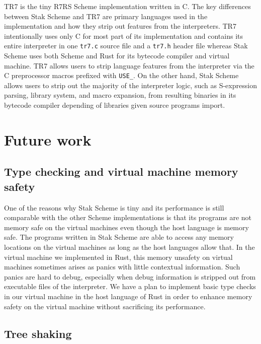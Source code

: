 \documentclass[sigplan, anonymous, review]{acmart}
\begin{document}
TR7 \cite{tr7} is the tiny R7RS Scheme implementation written in C.
The key differences between Stak Scheme and TR7 are primary languages used in
the implementation and how they strip out features from the
interpreters.
TR7 intentionally uses only C for most part of its implementation and
contains its entire interpreter in one \texttt{tr7.c} source file and a
\texttt{tr7.h} header file whereas Stak Scheme uses both Scheme and
Rust for its bytecode compiler and virtual machine.
TR7 allows users to strip language features from the interpreter via
the C preprocessor macros prefixed with \texttt{USE\_}.
On the other hand, Stak Scheme allows users to strip out the majority of
the interpreter logic, such as S-expression parsing, library system, and
macro expansion, from resulting binaries in its bytecode compiler
depending of libraries given source programs import.

\section{Future work}

\subsection{Type checking and virtual machine memory safety}

One of the reasons why Stak Scheme is tiny and its performance is still
comparable with the other Scheme implementations is that its
programs are not memory safe on the virtual machines even though
the host language is memory safe.
The programs written in Stak Scheme are able to access any memory
locations on the virtual machines as long as the host languages allow that.
In the virtual machine we implemented in Rust, this memory
unsafety on virtual machines sometimes arises as panics with little
contextual information.
Such panics are hard to debug, especially when debug information is
stripped out from executable files of the interpreter.
We have a plan to implement basic type checks in our virtual machine
in the host language of Rust in order to enhance memory safety on
the virtual machine without sacrificing its performance.

\subsection{Tree shaking}
\end{document}
